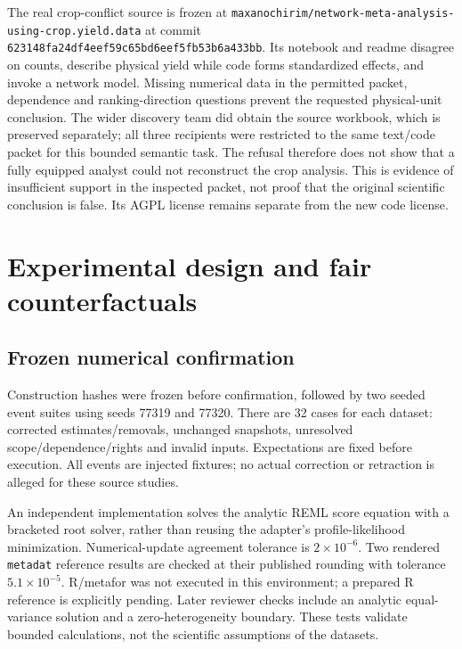 \documentclass[11pt]{article}
\begin{document}
The real crop-conflict source is frozen at \nolinkurl{maxanochirim/network-meta-analysis-using-crop.yield.data} at commit \nolinkurl{623148fa24df4eef59c65bd6eef5fb53b6a433bb}. Its notebook and readme disagree on counts, describe physical yield while code forms standardized effects, and invoke a network model. Missing numerical data in the permitted packet, dependence and ranking-direction questions prevent the requested physical-unit conclusion. The wider discovery team did obtain the source workbook, which is preserved separately; all three recipients were restricted to the same text/code packet for this bounded semantic task. The refusal therefore does not show that a fully equipped analyst could not reconstruct the crop analysis. This is evidence of insufficient support in the inspected packet, not proof that the original scientific conclusion is false. Its AGPL license remains separate from the new code license.\citep{crop}

\section{Experimental design and fair counterfactuals}

\subsection{Frozen numerical confirmation}

Construction hashes were frozen before confirmation, followed by two seeded event suites using seeds 77319 and 77320. There are 32 cases for each dataset: corrected estimates/removals, unchanged snapshots, unresolved scope/dependence/rights and invalid inputs. Expectations are fixed before execution. All events are injected fixtures; no actual correction or retraction is alleged for these source studies.

An independent implementation solves the analytic REML score equation with a bracketed root solver, rather than reusing the adapter's profile-likelihood minimization. Numerical-update agreement tolerance is $2\times 10^{-6}$. Two rendered \texttt{metadat} reference results are checked at their published rounding with tolerance $5.1\times 10^{-5}$. R/metafor was not executed in this environment; a prepared R reference is explicitly pending. Later reviewer checks include an analytic equal-variance solution and a zero-heterogeneity boundary. These tests validate bounded calculations, not the scientific assumptions of the datasets.
\end{document}
